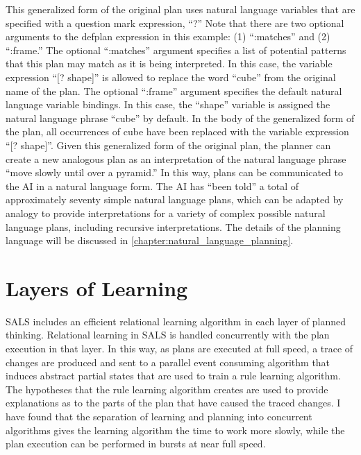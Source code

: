 This generalized form of the original plan uses natural language
variables that are specified with a question mark expression, ``?''
Note that there are two optional arguments to the defplan expression
in this example: (1) ``:matches'' and (2) ``:frame.''  The optional
``:matches'' argument specifies a list of potential patterns that this
plan may match as it is being interpreted.  In this case, the variable
expression ``[? shape]'' is allowed to replace the word ``cube'' from
the original name of the plan.  The optional ``:frame'' argument
specifies the default natural language variable bindings.  In this
case, the ``shape'' variable is assigned the natural language phrase
``cube'' by default.  In the body of the generalized form of the plan,
all occurrences of cube have been replaced with the variable
expression ``[? shape]''.  Given this generalized form of the original
plan, the planner can create a new analogous plan as an interpretation
of the natural language phrase ``move slowly until over a pyramid.''
In this way, plans can be communicated to the AI in a natural language
form.  The AI has ``been told'' a total of approximately seventy
simple natural language plans, which can be adapted by analogy to
provide interpretations for a variety of complex possible natural
language plans, including recursive interpretations.  The details of
the planning language will be discussed in
{\mbox{\autoref{chapter:natural_language_planning}}}.

\section{Layers of Learning}

SALS includes an efficient relational learning algorithm in each layer
of planned thinking.  Relational learning in SALS is handled
concurrently with the plan execution in that layer.  In this way, as
plans are executed at full speed, a trace of changes are produced and
sent to a parallel event consuming algorithm that induces abstract
partial states that are used to train a rule learning algorithm.  The
hypotheses that the rule learning algorithm creates are used to
provide explanations as to the parts of the plan that have caused the
traced changes.  I have found that the separation of learning and
planning into concurrent algorithms gives the learning algorithm the
time to work more slowly, while the plan execution can be performed in
bursts at near full speed.

